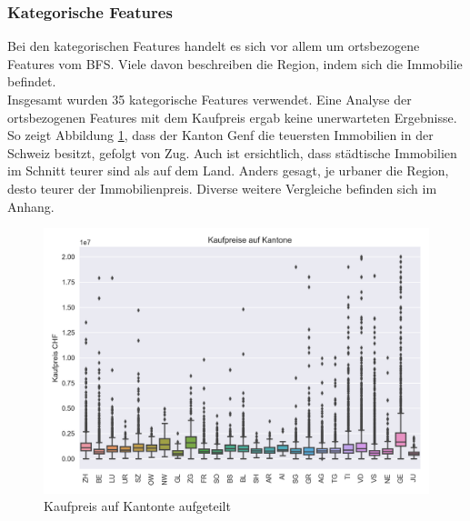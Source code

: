 \subsubsection{Kategorische Features}
Bei den kategorischen Features handelt es sich vor allem um ortsbezogene Features vom BFS. Viele davon beschreiben die Region, indem sich die Immobilie befindet.\\
Insgesamt wurden 35 kategorische Features verwendet. Eine Analyse der ortsbezogenen Features mit dem Kaufpreis ergab keine unerwarteten Ergebnisse. So zeigt Abbildung \ref{fig:cantons}, dass der Kanton Genf die teuersten Immobilien in der Schweiz besitzt, gefolgt von Zug.
Auch ist ersichtlich, dass städtische Immobilien im Schnitt teurer sind als auf dem Land. Anders gesagt, je urbaner die Region, desto teurer der Immobilienpreis. Diverse weitere Vergleiche befinden sich im Anhang.\\[2ex]
\begin{figure}[ht]
\centering
\includegraphics[width=\textwidth]{images/boxPlot_cantons.png}
\caption[Kaufpreis auf Kantonte aufgeteilt]{Kaufpreis auf Kantonte aufgeteilt}%
\label{fig:cantons}
\end{figure}

